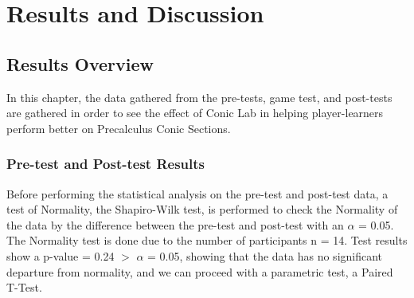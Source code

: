 %
%
%                 

\chapter{Results and Discussion}
\label{sec:results }

\section{Results Overview}
\label{sec:resultoverview}
In this chapter, the data gathered from the pre-tests, game test, and post-tests are gathered in order to see the effect of Conic Lab in helping player-learners perform better on Precalculus Conic Sections. 

\begin{comment}
A pre-test was given to the participants before they were allowed to test the game. This was done in order to determine the participant's baseline knowledge about the topic of Precalculus conic sections. There were a total of 12 participants, which are all senior high school students from STEM strand and had a prior experience with learning about the target Precalculus topic for the game. These students range from grade 11 and grade 12. The participants were asked to take the pre-test before testing the game, which would be followed by a post-test after in order to compare their two scores with each other.

The conic test was divided to the four types of conic sections: circle, parabola, ellipse, and hyperbola. The goal is to determine their level of understanding for each of them. Each type of the conic sections have multiple problems about them with varying difficulty.

\end{comment}
\subsection{Pre-test and Post-test Results}
Before performing the statistical analysis on the pre-test and post-test data, a test of Normality, the Shapiro-Wilk test, is performed to check the Normality of the data by the difference between the pre-test and post-test with an $\alpha$ = 0.05. The Normality test is done due to the number of participants n = 14. Test results show a p-value = 0.24 $>$ $\alpha$ = 0.05, showing that the data has no significant departure from normality, and we can proceed with a parametric test, a Paired T-Test.

